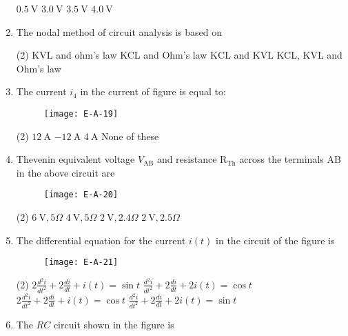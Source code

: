 \begin{enumerate}
\begin{tasks}
	\task[\textbf{a.}]$0.5 \mathrm{~V}$
	\task[\textbf{b.}]$3.0 \mathrm{~V}$
	\task[\textbf{c.}]$3.5 \mathrm{~V}$
	\task[\textbf{d.}]$4.0 \mathrm{~V}$ 
\end{tasks}
\item The nodal method of circuit analysis is based on
 \begin{tasks}(2)
	\task[\textbf{a.}]KVL and ohm's law
	\task[\textbf{b.}]KCL and Ohm's law
	\task[\textbf{c.}]$\mathrm{KCL}$ and $\mathrm{KVL}$
	\task[\textbf{d.}]KCL, KVL and Ohm's law 
\end{tasks}
\item The current $i_{4}$ in the current of figure is equal to:
\begin{figure}[H]
	\centering
	\texttt{[image: E-A-19]}
	\caption{}
	\label{}
\end{figure}
 \begin{tasks}(2)
	\task[\textbf{a.}]$12 \mathrm{~A}$
	\task[\textbf{b.}]$-12 \mathrm{~A}$
	\task[\textbf{c.}]$4 \mathrm{~A}$
	\task[\textbf{d.}]None of these
\end{tasks}
\item Thevenin equivalent voltage $V_{\mathrm{AB}}$ and resistance $\mathrm{R}_{\mathrm{Th}}$ across the terminals $\mathrm{AB}$ in the above circuit are
\begin{figure}[H]
	\centering
	\texttt{[image: E-A-20]}
	\caption{}
	\label{}
\end{figure}
 \begin{tasks}(2)
	\task[\textbf{a.}]$6 \mathrm{~V}, 5 \Omega$
	\task[\textbf{b.}]$4 \mathrm{~V}, 5 \Omega$
	\task[\textbf{c.}]$2 \mathrm{~V}, 2.4 \Omega$
	\task[\textbf{d.}]$2 \mathrm{~V}, 2.5 \Omega$
\end{tasks}
\item The differential equation for the current $i(t)$ in the circuit of the figure is
\begin{figure}[H]
	\centering
	\texttt{[image: E-A-21]}
	\caption{}
	\label{}
\end{figure}
 \begin{tasks}(2)
	\task[\textbf{a.}] $2 \frac{d^{2} i}{d t^{2}}+2 \frac{d i}{d t}+i(t)=\sin t$
	\task[\textbf{b.}]$\frac{d^{2} i}{d t^{2}}+2 \frac{d i}{d t}+2 i(t)=\cos t$
	\task[\textbf{c.}]$2 \frac{d^{2} i}{d t^{2}}+2 \frac{d i}{d t}+i(t)=\cos t$
	\task[\textbf{d.}] $\frac{d^{2} i}{d t^{2}}+2 \frac{d i}{d t}+2 i(t)=\sin t$
\end{tasks}
\item The $R C$ circuit shown in the figure is

\end{enumerate}
